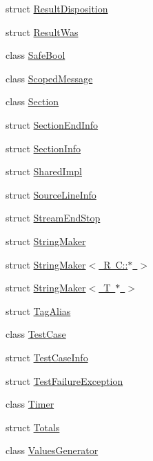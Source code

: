 \begin{DoxyCompactItemize}
struct \mbox{\hyperlink{struct_catch_1_1_result_disposition}{Result\+Disposition}}
\item 
struct \mbox{\hyperlink{struct_catch_1_1_result_was}{Result\+Was}}
\item 
class \mbox{\hyperlink{class_catch_1_1_safe_bool}{Safe\+Bool}}
\item 
class \mbox{\hyperlink{class_catch_1_1_scoped_message}{Scoped\+Message}}
\item 
class \mbox{\hyperlink{class_catch_1_1_section}{Section}}
\item 
struct \mbox{\hyperlink{struct_catch_1_1_section_end_info}{Section\+End\+Info}}
\item 
struct \mbox{\hyperlink{struct_catch_1_1_section_info}{Section\+Info}}
\item 
struct \mbox{\hyperlink{struct_catch_1_1_shared_impl}{Shared\+Impl}}
\item 
struct \mbox{\hyperlink{struct_catch_1_1_source_line_info}{Source\+Line\+Info}}
\item 
struct \mbox{\hyperlink{struct_catch_1_1_stream_end_stop}{Stream\+End\+Stop}}
\item 
struct \mbox{\hyperlink{struct_catch_1_1_string_maker}{String\+Maker}}
\item 
struct \mbox{\hyperlink{struct_catch_1_1_string_maker_3_01_r_01_c_1_1_5_01_4}{String\+Maker$<$ R C\+::$\ast$ $>$}}
\item 
struct \mbox{\hyperlink{struct_catch_1_1_string_maker_3_01_t_01_5_01_4}{String\+Maker$<$ T $\ast$ $>$}}
\item 
struct \mbox{\hyperlink{struct_catch_1_1_tag_alias}{Tag\+Alias}}
\item 
class \mbox{\hyperlink{class_catch_1_1_test_case}{Test\+Case}}
\item 
struct \mbox{\hyperlink{struct_catch_1_1_test_case_info}{Test\+Case\+Info}}
\item 
struct \mbox{\hyperlink{struct_catch_1_1_test_failure_exception}{Test\+Failure\+Exception}}
\item 
class \mbox{\hyperlink{class_catch_1_1_timer}{Timer}}
\item 
struct \mbox{\hyperlink{struct_catch_1_1_totals}{Totals}}
\item 
class \mbox{\hyperlink{class_catch_1_1_values_generator}{Values\+Generator}}
\end{DoxyCompactItemize}
